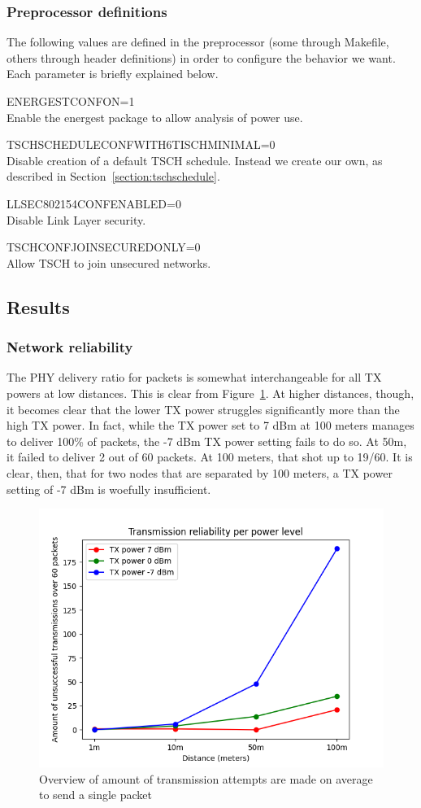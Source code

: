 \documentclass[conference]{IEEEtran}
\newcommand{\figref}[1]{Figure~\ref{#1}}
\newcommand{\secref}[1]{Section~\ref{#1}}
\renewcommand\_{\textunderscore\allowbreak}
\begin{document}
\subsubsection{Preprocessor definitions}

The following values are defined in the preprocessor (some through Makefile, others through header definitions) in order to configure the behavior we want. Each parameter is briefly explained below.

\label{section:preprocessdef}
\begin{itemize}
{
\small
\item ENERGEST\_CONF\_ON=1\\ Enable the energest package to allow analysis of power use. 
\item TSCH\_SCHEDULE\_CONF\_WITH\_6TISCH\_MINIMAL=0\\ Disable creation of a default TSCH schedule. Instead we create our own, as described in \secref{section:tschschedule}.
\item LLSEC802154\_CONF\_ENABLED=0\\ Disable Link Layer security.
\item TSCH\_CONF\_JOIN\_SECURED\_ONLY=0\\ Allow TSCH to join unsecured networks.
}
\end{itemize}



\subsection{Results}


\subsubsection{Network reliability}
The PHY delivery ratio for packets is somewhat interchangeable for all TX powers at low distances. This is clear from \figref{fig:txattempts}. At higher distances, though, it becomes clear that the lower TX power struggles significantly more than the high TX power. In fact, while the TX power set to 7 dBm at 100 meters manages to deliver 100\% of packets, the -7 dBm TX power setting fails to do so. At 50m, it failed to deliver 2 out of 60 packets. At 100 meters, that shot up to 19/60. It is clear, then, that for two nodes that are separated by 100 meters, a TX power setting of -7 dBm is woefully insufficient. 


\begin{figure}[htbp]
	\centering
	\includegraphics[width=.48\textwidth,keepaspectratio]{figures/retransmissions}
	\caption{Overview of amount of transmission attempts are made on average to send a single packet}
	\label{fig:txattempts}
\end{figure}
\end{document}
